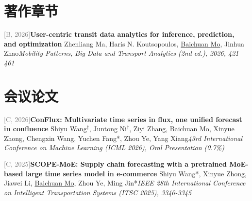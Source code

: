 \section{著作章节}
\par\noindent\begin{minipage}{\linewidth}
{\textcolor{gray}{[B\themyBookChapter, 2026]\;}}{\textbf{User-centric transit data analytics for inference, prediction, and optimization} \href{https://doi.org/10.1016/B978-0-443-26789-5.00018-3}{\textcolor{cadmiumorange}{\faExternalLink}}}{\newline Zhenliang Ma, Haris N. Koutsopoulos, \underline{Baichuan Mo}, Jinhua Zhao}{\newline \emph{Mobility Patterns, Big Data and Transport Analytics (2nd ed.), 2026, 421-461}}{{}}{}
\end{minipage}\par\vspace{5.5pt}


\vspace{7pt}

\section{会议论文}
\par\noindent\begin{minipage}{\linewidth}
{\textcolor{gray}{[C\themyCounterNew, 2026]\;}}{\textbf{ConFlux: Multivariate time series in flux, one unified forecast in confluence} \href{https://openreview.net/forum?id=qugRvYjaFx}{\textcolor{cadmiumorange}{\faExternalLink}}}{\newline Shiyu Wang$^\dagger$, Juntong Ni$^\dagger$, Ziyi Zhang, \underline{Baichuan Mo}, Xinyue Zhong, Chengxin Wang, Yuchen Fang*, Zhou Ye, Yang Xiang}{\newline \emph{43rd International Conference on Machine Learning (ICML 2026), Oral Presentation (0.7\%)}}{{}}{}
\end{minipage}\par\vspace{5.5pt}


\par\noindent\begin{minipage}{\linewidth}
{\textcolor{gray}{[C\themyCounterNew, 2025]\;}}{\textbf{SCOPE-MoE: Supply chain forecasting with a pretrained MoE-based large time series model in e-commerce} \href{https://doi.org/10.1109/ITSC60802.2025.11423301}{\textcolor{cadmiumorange}{\faExternalLink}}}{\newline Shiyu Wang*, Xinyue Zhong, Jiawei Li, \underline{Baichuan Mo}, Zhou Ye, Ming Jin*}{\newline \emph{IEEE 28th International Conference on Intelligent Transportation Systems (ITSC 2025), 3340-3345}}{{}}{}
\end{minipage}\par\vspace{5.5pt}


